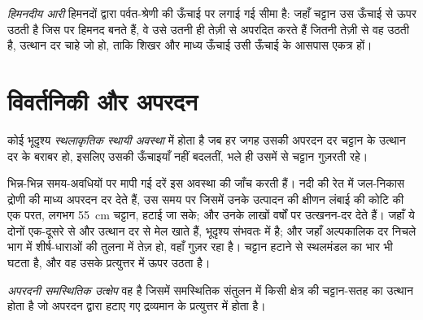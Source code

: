 \begin{definition}[हिमनदीय आरी]\label{def:b3:quantitative-geomorphology:buzzsaw}
\emph{हिमनदीय आरी} हिमनदों द्वारा पर्वत-श्रेणी की ऊँचाई पर
लगाई गई सीमा है: जहाँ चट्टान उस ऊँचाई से ऊपर उठती है
जिस पर हिमनद बनते हैं, वे उसे उतनी ही तेज़ी से अपरदित करते हैं जितनी तेज़ी से वह उठती है, उत्थान दर चाहे
जो हो, ताकि शिखर और माध्य ऊँचाई उसी ऊँचाई के आसपास एकत्र हों।
\end{definition}

\section{विवर्तनिकी और अपरदन}\label{sec:b3:quantitative-geomorphology:tectonics}

\begin{definition}[स्थलाकृतिक स्थायी अवस्था]\label{def:b3:quantitative-geomorphology:steady-state}
कोई भूदृश्य \emph{स्थलाकृतिक स्थायी अवस्था} में होता है
जब हर जगह उसकी अपरदन दर चट्टान के उत्थान दर के बराबर हो, इसलिए
उसकी ऊँचाइयाँ नहीं बदलतीं, भले ही उसमें से चट्टान गुज़रती रहे।
\end{definition}

भिन्न-भिन्न समय-अवधियों पर मापी गई दरें इस अवस्था की जाँच करती हैं।  नदी की रेत में जल-निकास द्रोणी की माध्य अपरदन दर देते हैं, उस समय पर
जिसमें उनके उत्पादन की क्षीणन लंबाई की कोटि की एक परत, लगभग
\qty{55}{cm} चट्टान, हटाई जा सके;  और उनके 
लाखों वर्षों पर उत्खनन-दर देते हैं। जहाँ ये दोनों एक-दूसरे से और उत्थान दर से मेल खाते हैं,
भूदृश्य संभवतः  में है; और जहाँ
अल्पकालिक दर निचले भाग में शीर्ष-धाराओं की तुलना में तेज़ हो,
वहाँ  गुज़र रहा है। चट्टान हटाने से स्थलमंडल का भार भी घटता है,
और वह उसके प्रत्युत्तर में ऊपर उठता है।

\begin{definition}\label{def:b3:quantitative-geomorphology:rebound}
\emph{अपरदनी समस्थितिक उत्क्षेप} वह है
जिसमें समस्थितिक संतुलन में किसी क्षेत्र की चट्टान-सतह का उत्थान होता है
जो अपरदन द्वारा हटाए गए द्रव्यमान के प्रत्युत्तर में होता है।
\end{definition}

